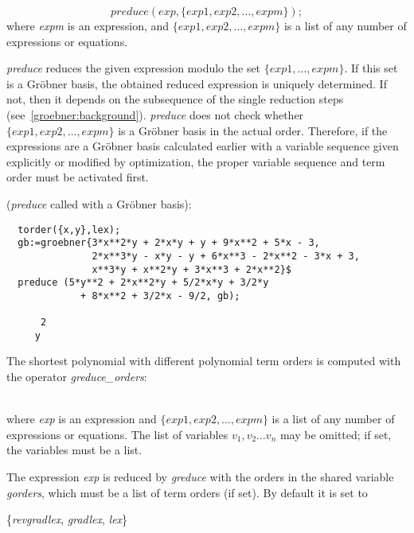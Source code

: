 \[
 preduce(exp, \{exp1, exp2,\ldots , expm\});
\]
where \emph{expm} is an expression, and $\{exp1, exp2, \ldots ,
expm\}$ is a list of any number of expressions or equations.

\emph{preduce} reduces the given expression modulo the set $\{exp1,
\ldots , expm\}$. If this set is a Gr\"obner basis, the obtained reduced
expression is uniquely determined. If not, then it depends on the
subsequence of the single reduction steps
(see~\ref{groebner:background}). \emph{preduce} does not check whether
$\{exp1, exp2, \ldots , expm\}$ is a Gr\"obner basis in the actual
order. Therefore, if the expressions are a Gr\"obner basis calculated
earlier with a variable sequence given explicitly or modified by
optimization, the proper variable sequence and term order must
be activated first.

\example (\emph{preduce} called with a Gr\"obner basis):
\begin{verbatim}
  torder({x,y},lex);
  gb:=groebner{3*x**2*y + 2*x*y + y + 9*x**2 + 5*x - 3,
               2*x**3*y - x*y - y + 6*x**3 - 2*x**2 - 3*x + 3,
               x**3*y + x**2*y + 3*x**3 + 2*x**2}$
  preduce (5*y**2 + 2*x**2*y + 5/2*x*y + 3/2*y
             + 8*x**2 + 3/2*x - 9/2, gb);

      2
     y
\end{verbatim}

The shortest polynomial with different polynomial term orders is computed
with the operator \emph{greduce\_orders}:

\begin{description}
\item[{{\it greduce\_orders}($exp$, \{$exp1$, $exp2$, \ldots , $expm$\}
[,\{$v_1,v_2,\ldots,v_n$\}]);}]\mbox{}\\
where {\it exp} is an expression and $\{exp1, exp2,\ldots , expm\}$ is
a list of any number of expressions or equations. The list of variables
$v_1,v_2 \ldots v_n$ may be omitted; if set, the variables must be a list.
\end{description}

The expression {\it exp} is reduced by {\it greduce} with the orders
in the shared variable {\it gorders}, which must be a list of term
orders (if set). By default it is set to

\begin{center}
\{\emph{revgradlex}, \emph{gradlex}, \emph{lex}\}
\end{center}

